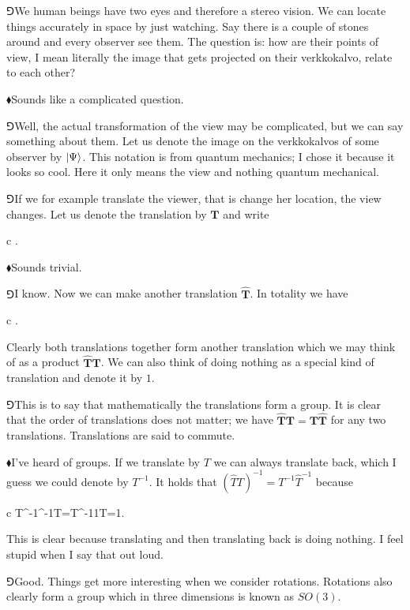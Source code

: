 \documentclass[10pt,oneside%
]{memoir}
\newenvironment{eqna}{\begin{IEEEeqnarray*}{c}}{\end{IEEEeqnarray*}\ignorespacesafterend}
\renewcommand{\vec}[1]{\mathbf{#1}}
\newcommand{\primed}[1]{\hat{#1}}
\newcommand{\hea}{\(\blacklozenge\)\;}
\newcommand{\heb}{\(\Game\)\;}
\begin{document}
\heb We human beings have two eyes and therefore a stereo vision. We can locate things accurately in space by just watching. Say there is a couple of stones around and every observer see them. The question is: how are their points of view, I mean literally the image that gets projected on their verkkokalvo, relate to each other?

\hea Sounds like a complicated question.

\heb Well, the actual transformation of the view may be complicated, but we can say something about them. Let us denote the image on the verkkokalvos of some observer by \(\ket{\Psi}\). This notation is from quantum mechanics; I chose it because it looks so cool. Here it only means the view and nothing quantum mechanical.

\heb If we for example translate the viewer, that is change her location, the view changes. Let us denote the translation by \(\vec{T}\) and write
\begin{eqna}
    \ket{\Psi}\rightarrow\vec{T}\ket{\Psi}.
\end{eqna}

\hea Sounds trivial.

\heb I know. Now we can make another translation \(\primed{\vec{T}}\). In totality we have
\begin{eqna}
    \ket{\Psi}\rightarrow\vec{T}\ket{\Psi}\rightarrow\primed{\vec{T}}\vec{T}\ket{\Psi}.
\end{eqna}
Clearly both translations together form another translation which we may think of as a product \(\primed{\vec{T}}\vec{T}\). We can also think of doing nothing as a special kind of translation and denote it by \(1\).

\heb This is to say that mathematically the translations form a group. It is clear that the order of translations does not matter; we have \(\primed{\vec{T}}\vec{T}=\vec{T}\primed{\vec{T}}\) for any two translations. Translations are said to commute.

\hea I've heard of groups. If we translate by \(T\) we can always translate back, which I guess we could denote by \(T^{-1}\). It holds that \((\primed{T}T)^{-1}=T^{-1}\primed{T}^{-1}\) because
\begin{eqna}
    T^{-1}\primed{T}^{-1}\primed{T}T=T^{-1}1T=1.
\end{eqna}
This is clear because translating and then translating back is doing nothing. I feel stupid when I say that out loud.

\heb Good. Things get more interesting when we consider rotations. Rotations also clearly form a group which in three dimensions is known as \(SO(3)\).
\end{document}
